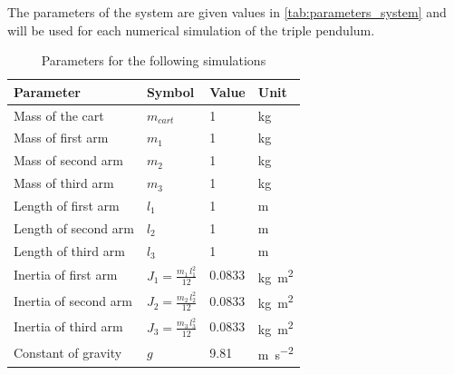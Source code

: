 \documentclass[a4paper,12pt]{article}
\begin{document}
The parameters of the system are given values in \autoref{tab:parameters_system} and will be used for each numerical simulation of the triple pendulum.
\begin{table}[H]
	\centering
	\caption{Parameters for the following simulations}
	\label{tab:parameters_system}
	\begin{tabular}{@{}llll@{}}
		\toprule
		Parameter             & Symbol                      & Value  & Unit                         \\ \midrule
		Mass of the cart      & $m_{cart}$                  & 1      & kg                           \\
		Mass of first arm     & $m_1$                       & 1      & kg                           \\
		Mass of second arm    & $m_2$                       & 1      & kg                           \\
		Mass of third arm     & $m_3$                       & 1      & kg                           \\
		Length of first arm   & $l_1$                       & 1      & m                            \\
		Length of second arm  & $l_2$                       & 1      & m                            \\
		Length of third arm   & $l_3$                       & 1      & m                            \\
		Inertia of first arm  & $J_1=\frac{m_1\,l_1^2}{12}$ & 0.0833 & \si{\kilo\gram\square\metre} \\
		Inertia of second arm & $J_2=\frac{m_2\,l_2^2}{12}$ & 0.0833 & \si{\kilo\gram\square\metre} \\
		Inertia of third arm  & $J_3=\frac{m_3\,l_3^2}{12}$ & 0.0833 & \si{\kilo\gram\square\metre} \\
		Constant of gravity   & $g$                         & 9.81   & \si{m\per\square\second}     \\ \bottomrule
	\end{tabular}
\end{table}
\end{document}
